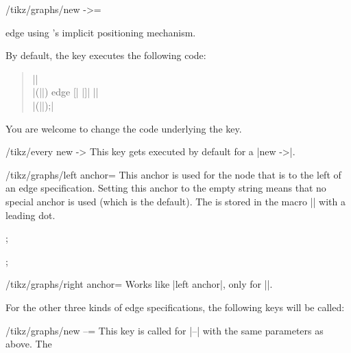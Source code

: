 \begin{enumerate}
\begin{key}{/tikz/graphs/new ->=}
\begin{enumerate}
                    edge using \tikzname's implicit positioning mechanism.
            \end{enumerate}
            By default, the key executes the following code:
            \begin{quote}
                ||\\
                \hbox{}\quad|(||\tikzgraphleftanchor) edge [|%
                |]| ||\\
                \hbox{}\quad|(||\tikzgraphrightanchor);|
            \end{quote}
            You are welcome to change the code underlying the key.
            \begin{stylekey}{/tikz/every new ->}
                This key gets executed by default for a |new ->|.
            \end{stylekey}
        \end{key}
        \begin{key}{/tikz/graphs/left anchor=}
            This anchor is used for the node that is to the left of an edge
            specification. Setting this anchor to the empty string means that
            no special anchor is used (which is the default). The 
            is stored in the macro |\tikzgraphleftanchor| with a leading dot.
\begin{codeexample}[preamble={\usetikzlibrary{graphs}}]
\tikz {};
\end{codeexample}
\begin{codeexample}[preamble={\usetikzlibrary{graphs}}]
\tikz {};
\end{codeexample}
        \end{key}
        \begin{key}{/tikz/graphs/right anchor=}
            Works like |left anchor|, only for |\tikzgraphrightanchor|.
        \end{key}
        For the other three kinds of edge specifications, the following keys
        will be called:
        \begin{key}{/tikz/graphs/new --=}
            This key is called for |--| with the same parameters as above. The

\end{key}
\end{enumerate}
